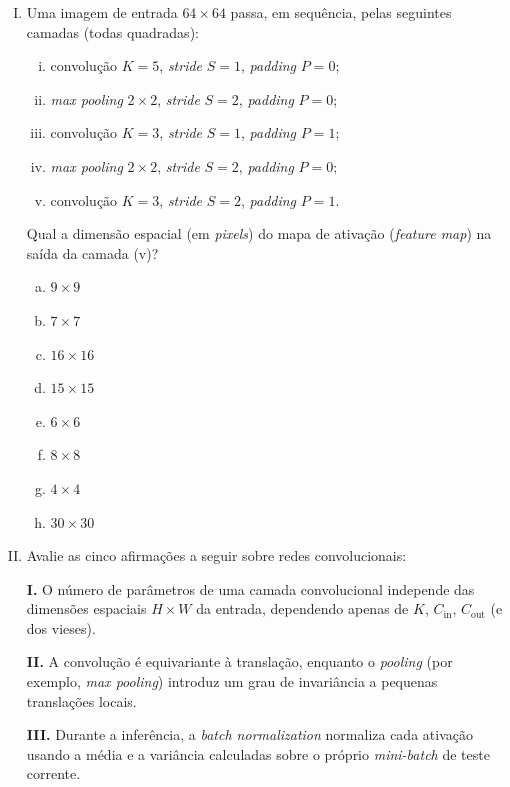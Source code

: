 \documentclass{dlproblemset}
\begin{document}
\begin{enumerate}[I)]
    \item Uma imagem de entrada $64 \times 64$ passa, em sequência, pelas seguintes camadas (todas quadradas):

    \begin{enumerate}[(i)]
        \item convolução $K = 5$, \textit{stride} $S = 1$, \textit{padding} $P = 0$;
        \item \textit{max pooling} $2 \times 2$, \textit{stride} $S = 2$, \textit{padding} $P = 0$;
        \item convolução $K = 3$, \textit{stride} $S = 1$, \textit{padding} $P = 1$;
        \item \textit{max pooling} $2 \times 2$, \textit{stride} $S = 2$, \textit{padding} $P = 0$;
        \item convolução $K = 3$, \textit{stride} $S = 2$, \textit{padding} $P = 1$.
    \end{enumerate}

    Qual a dimensão espacial (em \textit{pixels}) do mapa de ativação (\textit{feature map}) na saída da camada (v)?

    \begin{enumerate}[a)]
        \item $9 \times 9$
        \item $7 \times 7$
        \item $16 \times 16$
        \item $15 \times 15$
        \item $6 \times 6$
        \item $8 \times 8$
        \item $4 \times 4$
        \item $30 \times 30$
    \end{enumerate}

    \item Avalie as cinco afirmações a seguir sobre redes convolucionais:

    \textbf{I.} O número de parâmetros de uma camada convolucional independe das dimensões espaciais $H \times W$ da entrada, dependendo apenas de $K$, $C_{\text{in}}$, $C_{\text{out}}$ (e dos vieses).

    \textbf{II.} A convolução é equivariante à translação, enquanto o \textit{pooling} (por exemplo, \textit{max pooling}) introduz um grau de invariância a pequenas translações locais.

    \textbf{III.} Durante a inferência, a \textit{batch normalization} normaliza cada ativação usando a média e a variância calculadas sobre o próprio \textit{mini-batch} de teste corrente.


\end{enumerate}
\end{document}

